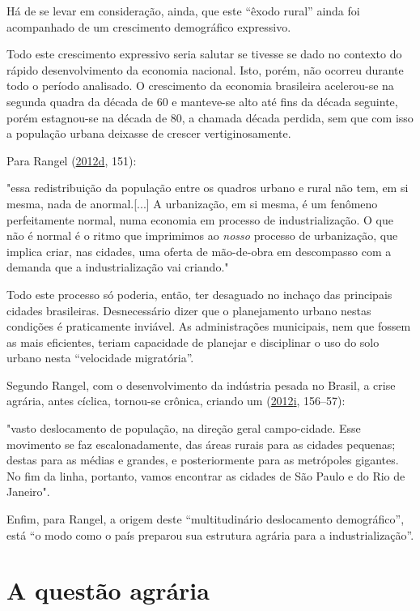 \documentclass[
	12pt,				%
	oneside,			%
	a4paper,			%
	chapter=TITLE,		%
	section=TITLE,		%
	english,			%
	brazil				%
	]{abntex2}
\begin{document}
Há de se levar em consideração, ainda, que este ``êxodo rural'' ainda foi
acompanhado de um crescimento demográfico expressivo.

Todo este crescimento expressivo seria salutar se tivesse se dado no contexto do
rápido desenvolvimento da economia nacional. Isto, porém, não ocorreu durante
todo o período analisado. O crescimento da economia brasileira acelerou-se na
segunda quadra da década de 60 e manteve-se alto até fins da década seguinte,
porém estagnou-se na década de 80, a chamada década perdida, sem que com isso a
população urbana deixasse de crescer vertiginosamente.

Para Rangel (\protect\hyperlink{ref-rangel1986a}{2012}\protect\hyperlink{ref-rangel1986a}{d}, 151):
\begin{citacao}
"essa redistribuição da população entre os quadros urbano e rural não tem, em si
mesma, nada de anormal.[...] A urbanização, em si mesma, é um fenômeno
perfeitamente normal, numa economia em processo de industrialização. O que não é
normal é o ritmo que imprimimos ao \emph{nosso} processo de urbanização, que
implica criar, nas cidades, uma oferta de mão-de-obra em descompasso com a
demanda que a industrialização vai criando."
\end{citacao}
Todo este processo só poderia, então, ter desaguado no inchaço das principais
cidades brasileiras. Desnecessário dizer que o planejamento urbano nestas
condições é praticamente inviável. As administrações municipais, nem que fossem
as mais eficientes, teriam capacidade de planejar e disciplinar o uso do solo
urbano nesta ``velocidade migratória''.

Segundo Rangel, com o desenvolvimento da indústria pesada no Brasil, a crise
agrária, antes cíclica, tornou-se crônica, criando um (\protect\hyperlink{ref-rangel1988}{2012}\protect\hyperlink{ref-rangel1988}{i}, 156--57):
\begin{citacao}
"vasto deslocamento de população, na direção geral campo-cidade. Esse movimento
se faz escalonadamente, das áreas rurais para as cidades pequenas; destas para
as médias e grandes, e posteriormente para as metrópoles gigantes. No fim da
linha, portanto, vamos encontrar as cidades de São Paulo e do Rio de Janeiro".
\end{citacao}
Enfim, para Rangel, a origem deste ``multitudinário deslocamento demográfico'',
está ``o modo como o país preparou sua estrutura agrária para a industrialização''.

\hypertarget{a-questuxe3o-agruxe1ria}{%
\section{A questão agrária}\label{a-questuxe3o-agruxe1ria}}
\end{document}

